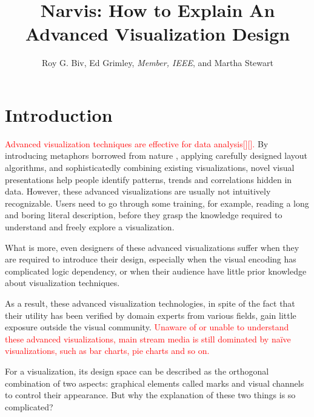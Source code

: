 \documentclass[review,journal]{vgtc}         %
\title{Narvis: How to Explain An Advanced Visualization Design}
\author{Roy G. Biv, Ed Grimley, \textit{Member, IEEE}, and Martha Stewart}
\newcommand{\wrong}[1]{\textcolor{red}{#1}}
\begin{document}
 


\maketitle
 
\section{Introduction} %
\wrong{Advanced visualization techniques are effective for data analysis[][].} By introducing metaphors borrowed from nature \cite{cao_whisper:_2012,huron_visual_2013}, applying carefully designed layout algorithms\cite{wu_opinionflow:_2014,chi_morphable_2015}, and sophisticatedly combining existing visualizations\cite{zhao_x0023;fluxflow:_2014}, novel visual presentations help people identify patterns, trends and correlations hidden in data. However, these advanced visualizations are usually not intuitively recognizable. Users need to go through some training, for example, reading a long and boring literal description, before they grasp the knowledge required to understand and freely explore a visualization.\par
What is more, even designers of these advanced visualizations suffer when they are required to introduce their design, especially when the visual encoding has complicated logic dependency, or when their audience have little prior knowledge about visualization techniques.\par
As a result, these advanced visualization technologies, in spite of
the fact that their utility has been verified by domain experts from various fields, gain little exposure outside the visual community. \wrong{Unaware of or unable to understand these advanced visualizations, main stream media is still dominated by naïve visualizations, such as bar charts, pie charts and so on.} \par
For a visualization, its design space can be described as the orthogonal combination of two aspects: graphical elements called marks and visual channels to control their appearance\cite{munzner_visualization_2014}. But why the explanation of these two things is so complicated? \par
\end{document}
